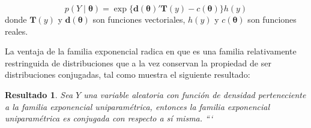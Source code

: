 \documentclass[
  spanish,
]{book}
\newtheorem{proposition}{Resultado}[chapter]
\theoremstyle{definition}
\theoremstyle{definition}
\theoremstyle{definition}
\theoremstyle{remark}
\begin{document}
\begin{equation}
\label{eq:multiexpo}
p(Y \mid \boldsymbol \theta)=\exp\{\mathbf{d}(\boldsymbol \theta)'\mathbf{T}(y)-c(\boldsymbol \theta)\}h(y)
\end{equation} donde \(\mathbf{T}(y)\) y \(\mathbf{d}(\boldsymbol \theta)\) son
funciones vectoriales, \(h(y)\) y \(c(\boldsymbol \theta)\) son funciones reales.

La ventaja de la familia exponencial radica en que es una familia
relativamente restringuida de distribuciones que a la vez conservan la
propiedad de ser distribuciones conjugadas, tal como muestra el
siguiente resultado:

\begin{proposition}
\protect\hypertarget{prp:FE1}{}{\label{prp:FE1} }Sea \(Y\) una variable aleatoria con función de densidad perteneciente a la familia exponencial uniparamétrica, entonces la familia exponencial uniparamétrica es conjugada con respecto a sí misma.
```
\end{proposition}
\end{document}
